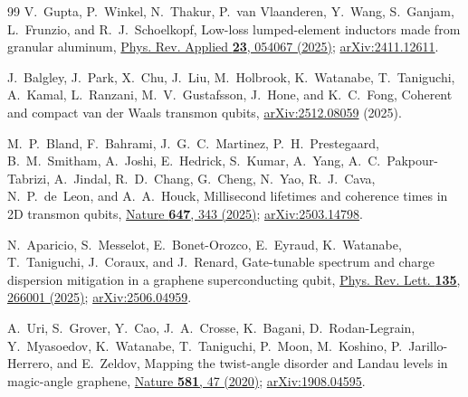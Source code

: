 \documentclass[aps,prb,reprint,superscriptaddress,longbibliography]{revtex4-2}
\begin{document}
\begin{thebibliography}{99}
V.~Gupta, P.~Winkel, N.~Thakur, P.~van Vlaanderen, Y.~Wang, S.~Ganjam,
L.~Frunzio, and R.~J.~Schoelkopf, Low-loss lumped-element inductors made
from granular aluminum,
\href{https://doi.org/10.1103/PhysRevApplied.23.054067}{Phys. Rev.
Applied \textbf{23}, 054067 (2025)};
\href{https://arxiv.org/abs/2411.12611}{arXiv:2411.12611}.

J.~Balgley, J.~Park, X.~Chu, J.~Liu, M.~Holbrook, K.~Watanabe,
T.~Taniguchi, A.~Kamal, L.~Ranzani, M.~V.~Gustafsson, J.~Hone, and
K.~C.~Fong, Coherent and compact van der Waals transmon qubits,
\href{https://arxiv.org/abs/2512.08059}{arXiv:2512.08059} (2025).

M.~P.~Bland, F.~Bahrami, J.~G.~C.~Martinez, P.~H.~Prestegaard,
B.~M.~Smitham, A.~Joshi, E.~Hedrick, S.~Kumar, A.~Yang,
A.~C.~Pakpour-Tabrizi, A.~Jindal, R.~D.~Chang, G.~Cheng, N.~Yao,
R.~J.~Cava, N.~P.~de~Leon, and A.~A.~Houck, Millisecond lifetimes and
coherence times in 2D transmon qubits,
\href{https://doi.org/10.1038/s41586-025-09687-4}{Nature \textbf{647},
343 (2025)}; \href{https://arxiv.org/abs/2503.14798}{arXiv:2503.14798}.

N.~Aparicio, S.~Messelot, E.~Bonet-Orozco, E.~Eyraud, K.~Watanabe,
T.~Taniguchi, J.~Coraux, and J.~Renard, Gate-tunable spectrum and charge
dispersion mitigation in a graphene superconducting qubit,
\href{https://doi.org/10.1103/3gy7-2r3n}{Phys. Rev. Lett. \textbf{135},
266001 (2025)}; \href{https://arxiv.org/abs/2506.04959}{arXiv:2506.04959}.

A.~Uri, S.~Grover, Y.~Cao, J.~A.~Crosse, K.~Bagani, D.~Rodan-Legrain,
Y.~Myasoedov, K.~Watanabe, T.~Taniguchi, P.~Moon, M.~Koshino,
P.~Jarillo-Herrero, and E.~Zeldov, Mapping the twist-angle disorder and
Landau levels in magic-angle graphene,
\href{https://doi.org/10.1038/s41586-020-2255-3}{Nature \textbf{581}, 47
(2020)}; \href{https://arxiv.org/abs/1908.04595}{arXiv:1908.04595}.

\end{thebibliography}
\end{document}
